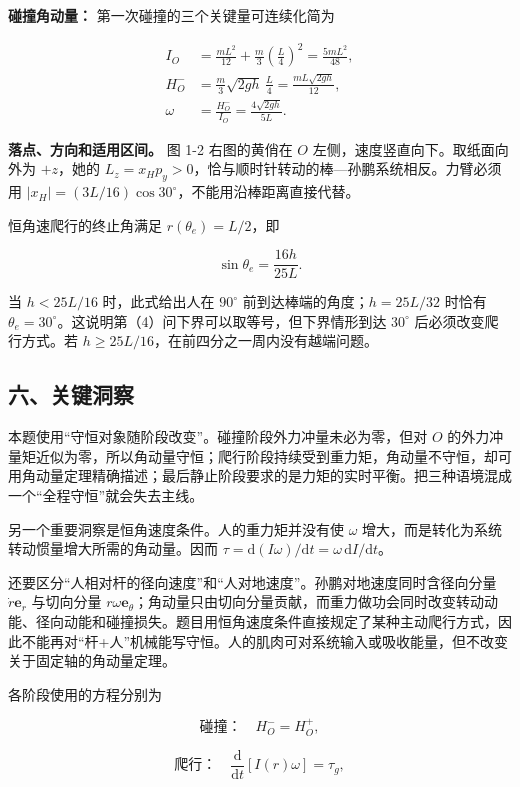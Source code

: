 \documentclass[12pt,a4paper,UTF8]{ctexart}
\begin{document}
\textbf{碰撞角动量：} 第一次碰撞的三个关键量可连续化简为

\[\begin{aligned}
I_O&=\frac{mL^2}{12}+\frac m3\left(\frac L4\right)^2
=\frac{5mL^2}{48},\\
H_O^-&=\frac m3\sqrt{2gh}\,\frac L4
=\frac{mL\sqrt{2gh}}{12},\\
\omega&=\frac{H_O^-}{I_O}
=\frac{4\sqrt{2gh}}{5L}.
\end{aligned}\]

\textbf{落点、方向和适用区间。} 图 1-2 右图的黄俏在 \(O\)
左侧，速度竖直向下。取纸面向外为 \(+z\)，她的
\(L_z=x_Hp_y>0\)，恰与顺时针转动的棒---孙鹏系统相反。力臂必须用
\(|x_H|=(3L/16)\cos30^\circ\)，不能用沿棒距离直接代替。

恒角速爬行的终止角满足 \(r(\theta_e)=L/2\)，即

\[\sin\theta_e=\frac{16h}{25L}.\]

当 \(h<25L/16\) 时，此式给出人在 \(90^\circ\)
前到达棒端的角度；\(h=25L/32\) 时恰有
\(\theta_e=30^\circ\)。这说明第（4）问下界可以取等号，但下界情形到达
\(30^\circ\) 后必须改变爬行方式。若
\(h\ge25L/16\)，在前四分之一周内没有越端问题。

\subsection{六、关键洞察}\label{ux516dux5173ux952eux6d1eux5bdf}

本题使用``守恒对象随阶段改变''。碰撞阶段外力冲量未必为零，但对 \(O\)
的外力冲量矩近似为零，所以角动量守恒；爬行阶段持续受到重力矩，角动量不守恒，却可用角动量定理精确描述；最后静止阶段要求的是力矩的实时平衡。把三种语境混成一个``全程守恒''就会失去主线。

另一个重要洞察是恒角速度条件。人的重力矩并没有使 \(\omega\)
增大，而是转化为系统转动惯量增大所需的角动量。因而
\(\tau=\mathrm d(I\omega)/\mathrm dt=\omega\,\mathrm dI/\mathrm dt\)。

还要区分``人相对杆的径向速度''和``人对地速度''。孙鹏对地速度同时含径向分量
\(\dot r\bm e_r\) 与切向分量
\(r\omega\bm e_\theta\)；角动量只由切向分量贡献，而重力做功会同时改变转动动能、径向动能和碰撞损失。题目用恒角速度条件直接规定了某种主动爬行方式，因此不能再对``杆+人''机械能写守恒。人的肌肉可对系统输入或吸收能量，但不改变关于固定轴的角动量定理。

各阶段使用的方程分别为

\[
\text{碰撞：}\quad H_O^-=H_O^+,
\]

\[
\text{爬行：}\quad \frac{\mathrm d}{\mathrm dt}[I(r)\omega]=\tau_g,
\]
\end{document}
